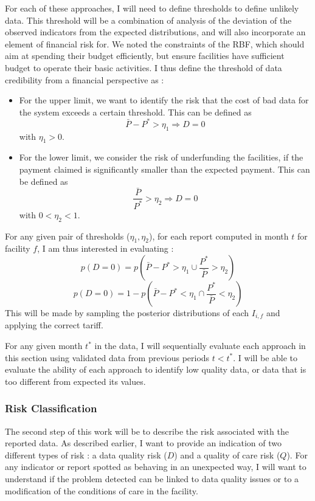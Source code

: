 \medskip

For each of these approaches, I will need to define thresholds to define unlikely data. This threshold will be a combination of analysis of the deviation of the observed indicators from the expected distributions, and will also incorporate an element of financial risk for. We noted the constraints of the RBF, which should aim at spending their budget efficiently, but ensure facilities have sufficient budget to operate their basic activities. I thus define the threshold of data credibility from a financial perspective as :

\begin{itemize}
\item For the upper limit, we want to identify the risk that the cost of bad data for the system exceeds a certain threshold. This can be defined as
$$ \bar{P} - P^{*} > \eta_1 \Rightarrow D = 0$$
with $\eta_1 > 0 $.

\item For the lower limit, we consider the risk of underfunding the facilities, if the payment claimed is significantly smaller than the expected payment. This can be defined as
$$  \frac{\bar{P}}{P^{*}} > \eta_2 \Rightarrow D = 0$$
with $0 < \eta_2 < 1 $.
\end{itemize}

For any given pair of thresholds ($\eta_1 , \eta_2$), for each report computed in month $t$ for facility $f$, I am thus interested in evaluating :
	$$p(D=0) = p(\bar{P} - P^{*} > \eta_1 \cup \frac{P^{*}}{\bar{P}} > \eta_2 ) $$
	$$p(D=0) = 1 - p(\bar{P} - P^{*} < \eta	_1 \cap \frac{P^{*}}{\bar{P}} < \eta_2 )$$
This will be made by sampling the posterior distributions of each $I_{i,f}$ and applying the correct tariff.

For any given month $t^{*}$ in the data, I will sequentially evaluate each approach in this section using validated data from previous periods $t < t^{*}$. I will be able to evaluate the ability of each approach to identify low quality data, or data that is too different from expected its values.

\subsubsection{Risk Classification}

The second step of this work will be to describe the risk associated with the reported data. As described earlier, I want to provide an indication of two different types of risk : a data quality risk ($D$) and a quality of care risk ($Q$). For any indicator or report spotted as behaving in an unexpected way, I will want to understand if the problem detected can be linked to data quality issues or to a modification of the conditions of care in the facility.

